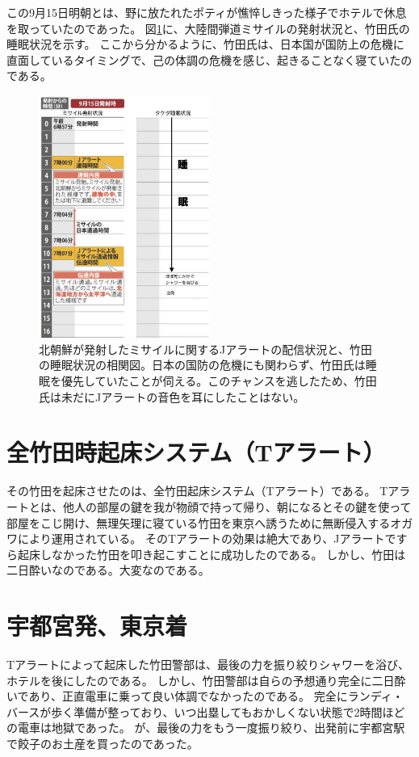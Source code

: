 この9月15日明朝とは、野に放たれたポティが憔悴しきった様子でホテルで休息を取っていたのであった。
図\ref{fig:Jalert}に、大陸間弾道ミサイルの発射状況と、竹田氏の睡眠状況を示す。
ここから分かるように、竹田氏は、日本国が国防上の危機に直面しているタイミングで、己の体調の危機を感じ、起きることなく寝ていたのである。
\begin{figure}[htbp]
  \begin{center}
    \includegraphics[width=0.5\textwidth]{./section/sasakiLIVE/figures/Suimin.jpg}
  \end{center}
  \caption{北朝鮮が発射したミサイルに関するJアラートの配信状況と、竹田の睡眠状況の相関図。日本の国防の危機にも関わらず、竹田氏は睡眠を優先していたことが伺える。このチャンスを逃したため、竹田氏は未だにJアラートの音色を耳にしたことはない。}
  \label{fig:Jalert}
\end{figure}

\section{全竹田時起床システム（Tアラート）}
その竹田を起床させたのは、全竹田起床システム（Tアラート）である。
Tアラートとは、他人の部屋の鍵を我が物顔で持って帰り、朝になるとその鍵を使って部屋をこじ開け、無理矢理に寝ている竹田を東京へ誘うために無断侵入するオガワにより運用されている。
そのTアラートの効果は絶大であり、Jアラートですら起床しなかった竹田を叩き起こすことに成功したのである。
しかし、竹田は二日酔いなのである。大変なのである。


\section{宇都宮発、東京着}
Tアラートによって起床した竹田警部は、最後の力を振り絞りシャワーを浴び、ホテルを後にしたのである。
しかし、竹田警部は自らの予想通り完全に二日酔いであり、正直電車に乗って良い体調でなかったのである。
完全にランディ・バースが歩く準備が整っており、いつ出塁してもおかしくない状態で2時間ほどの電車は地獄であった。
が、最後の力をもう一度振り絞り、出発前に宇都宮駅で餃子のお土産を買ったのであった。

